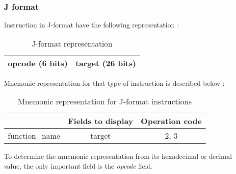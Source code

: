 \subsubsection*{J format}

	Instruction in J-format have the following representation :
	
	\begin{table}[H]
		\centering
		\begin{tabular}{|c|c|}
			\hline
			opcode (6 bits) & target (26 bits)\\
			\hline
		\end{tabular}
		\caption{J-format representation}
	\end{table}
	
	Mnemonic representation for that type of instruction is described below :
	\begin{table}[H]
		\centering
		\begin{tabular}{|c|c|c|}
			\hline
			& \textbf{Fields to display} & \textbf{Operation code}\\
			\hline
			function\_name & target  & 2, 3\\
			\hline
		\end{tabular}
		\caption{Mnemonic representation for J-format instructions}
	\end{table}
	
	To determine the mnemonic representation from its hexadecimal or decimal value, the only important field is the \textit{opcode} field.